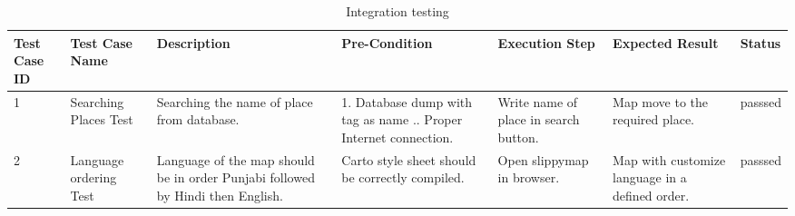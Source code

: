 \begin{table}
\caption{Integration testing}

\begin{tabular}{|p{1cm}|p{2cm}|p{3cm}|p{2cm}|p{2cm}|p{3cm}|p{1.2cm}|}
\hline
Test Case ID & Test Case Name & Description & Pre-Condition
 & Execution Step & Expected Result
 & Status \\ 
\hline \rule[-2ex]{0pt}{5.5ex}  1 &
Searching Places
Test
 &  Searching the name of place from database.
 & 1. Database dump with tag as name .\newline
 2. Proper Internet connection.
&  Write name of place in search button.
 & Map move to the required place.
 &  passsed\\
\hline \rule[-2ex]{0pt}{5.5ex}  2 &
Language ordering
Test
& Language of the map should be in order Punjabi followed by  Hindi then English.
&  Carto style sheet should be correctly compiled.
 &  Open slippymap in browser.\newline
 & Map with customize language in a defined order.
  & passsed\\
\hline
\end{tabular}
\end{table}

